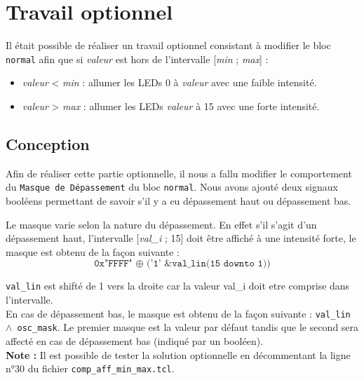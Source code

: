 \newpage

\section{Travail optionnel}

Il était possible de réaliser un travail optionnel consistant à modifier le bloc \texttt{normal} afin que si \textit{valeur} est hors de l'intervalle [\textit{min} ; \textit{max}] :

\begin{itemize}

\item \textit{valeur} < \textit{min} : allumer les LEDs 0 à \textit{valeur} avec une faible intensité.
\item \textit{valeur} > \textit{max} : allumer les LEDs \textit{valeur} à 15 avec une forte intensité.

\end{itemize}

\subsection{Conception}

Afin de réaliser cette partie optionnelle, il nous a fallu modifier le comportement du \texttt{Masque de Dépassement} du bloc \texttt{normal}. Nous avons ajouté deux signaux booléens permettant de savoir s'il y a eu dépassement haut ou dépassement bas.

Le masque varie selon la nature du dépassement. En effet s'il s'agit d'un dépassement haut, l'intervalle [\textit{val\_i} ; 15] doit être affiché à une intensité forte, le masque est obtenu de la façon suivante :
\begin{equation*}
 \texttt{0x"FFFF" $\oplus$ ('1' \& val\_lin(15 downto 1))} 
\end{equation*}

 \texttt{val\_lin} est shifté de 1 vers la droite car la valeur val\_i doit etre comprise dans l'intervalle. \\
 En cas de dépassement bas, le masque est obtenu de la façon suivante : \texttt{val\_lin $\land$ osc\_mask}. Le premier masque est la valeur par défaut tandis que le second sera affecté en cas de dépassement bas (indiqué par un booléen). \\
 
\textbf{Note :} Il est possible de tester la solution optionnelle en décommentant la ligne n°30 du fichier \texttt{comp\_aff\_min\_max.tcl}.
 
